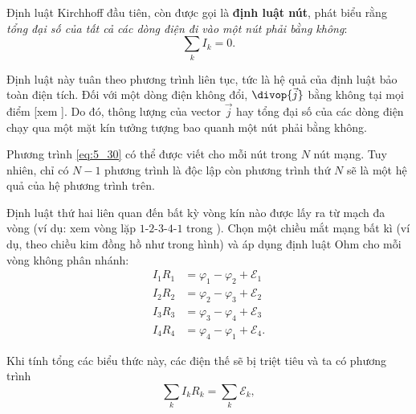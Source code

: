 Định luật Kirchhoff đầu tiên, còn được gọi là \textbf{định luật nút}, phát biểu rằng \textit{tổng đại số của tất cả các dòng điện đi vào một nút phải bằng không}:
\begin{equation}\label{eq:5_30}
    \sum_k I_k = 0.
\end{equation}

\noindent
Định luật này tuân theo phương trình liên tục, tức là hệ quả của định luật bảo toàn điện tích. Đối với một dòng điện không đổi, $\divop{\vec{j}}$ bằng không tại mọi điểm [xem ]. Do đó, thông lượng của vector $\vec{j}$ hay tổng đại số của các dòng điện chạy qua một mặt kín tưởng tượng bao quanh một nút phải bằng không.

Phương trình \eqref{eq:5_30} có thể được viết cho mỗi nút trong $N$ nút mạng. Tuy nhiên, chỉ có $N-1$ phương trình là độc lập còn phương trình thứ $N$ sẽ là một hệ quả của hệ phương trình trên.

Định luật thứ hai liên quan đến bất kỳ vòng kín nào được lấy ra từ mạch đa vòng (ví dụ: xem vòng lặp $1$-$2$-$3$-$4$-$1$ trong ). Chọn một chiều mắt mạng bất kì (ví dụ, theo chiều kim đồng hồ như trong hình) và áp dụng định luật Ohm cho mỗi vòng không phân nhánh:
\begin{align*}
    I_1 R_1 &= \varphi_1 - \varphi_2 + \mathcal{E}_1\\
    I_2 R_2 &= \varphi_2 - \varphi_3 + \mathcal{E}_2\\
    I_3 R_3 &= \varphi_3 - \varphi_4 + \mathcal{E}_3\\
    I_4 R_4 &= \varphi_4 - \varphi_1 + \mathcal{E}_4.
\end{align*}

\noindent
Khi tính tổng các biểu thức này, các điện thế sẽ bị triệt tiêu và ta có phương trình
\begin{equation}\label{eq:5_31}
    \sum_k I_k R_k = \sum_k \mathcal{E}_k,
\end{equation}

